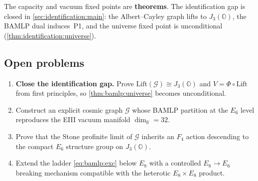 \begin{remark}[Closure]\label{rem:bamlp:proved-vs-conj}
The capacity and vacuum fixed points are \textbf{theorems}. The identification
gap is closed in \autoref{sec:identification:main}: the Albert--Cayley graph
lifts to $J_3(\mathbb{O})$, the BAMLP dual induces~\textnormal{P1}, and the
universe fixed point is unconditional (\autoref{thm:identification:universe}).
\end{remark}

\subsection{Open problems}
\label{sec:bamlp:open}

\begin{enumerate}
  \item \textbf{Close the identification gap.} Prove
    $\mathrm{Lift}(\mathcal{G})\cong J_3(\mathbb{O})$ and $V=\Phi\circ\mathrm{Lift}$
    from first principles, so \autoref{thm:bamlp:universe} becomes unconditional.
  \item Construct an explicit cosmic graph $\mathcal{G}$ whose BAMLP partition
    at the $E_6$ level reproduces the EIII vacuum manifold
    $\dim_{\mathbb{R}}=32$.
  \item Prove that the Stone profinite limit of $\mathcal{G}$ inherits an
    $F_4$ action descending to the compact $E_6$ structure group on
    $J_3(\mathbb{O})$.
  \item Extend the ladder \eqref{eq:bamlp:exc} below $E_8$ with a controlled
    $E_8\to E_6$ breaking mechanism compatible with the heterotic
    $E_8\times E_8$ product.
\end{enumerate}